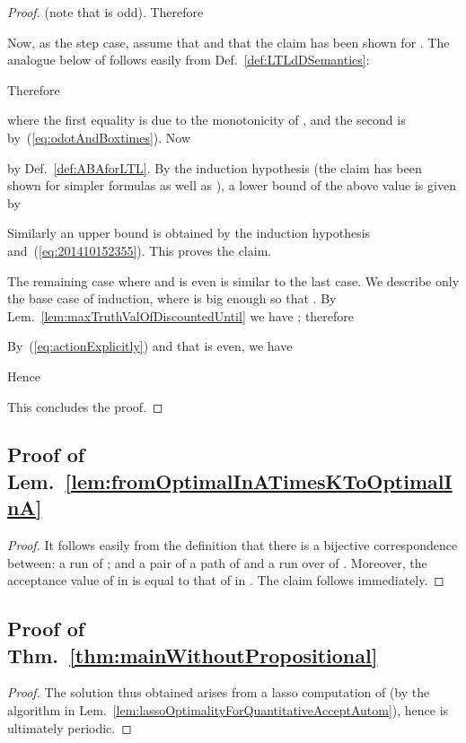 \documentclass[a4paper,USenglish,numberwithinsect]{lipics}
\theoremstyle{definition}
\theoremstyle{remark}
\theoremstyle{plain}
\begin{document}
\begin{proof}
(note that  is odd). Therefore



Now, as the step case, assume that   and that the claim has been shown for
 . The  analogue below of
  follows easily from Def.~\ref{def:LTLdDSemantics}:

Therefore

where the first equality is due to the monotonicity of
 , and the second is by~(\ref{eq:odotAndBoxtimes}).
Now

by Def.~\ref{def:ABAforLTL}. 
By the induction hypothesis (the claim has been shown for simpler
 formulas as well as ), a lower bound of the above value is given by

Similarly an upper bound  is obtained by the induction hypothesis
 and~(\ref{eq:201410152355}). This proves the claim.






The remaining case where 
  and 
   is even is similar to the last case. 
We describe only the base case of induction, where  is  big enough so that
 . By
 Lem.~\ref{lem:maxTruthValOfDiscountedUntil}
 we have ; therefore

By~(\ref{eq:actionExplicitly}) and that  is even, we have

Hence

This concludes the proof.
\end{proof}


\subsection{Proof of Lem.~\ref{lem:fromOptimalInATimesKToOptimalInA}}
\label{pf:lemfromOptimalInATimesKToOptimalInA}
\begin{proof}
 It follows easily from the definition that there is a bijective
 correspondence between: a run  of ; and a pair  of
 a path  of  and 
 a run  over  of . Moreover, 
 the acceptance value of  in  is equal to
 that of  in . The claim follows immediately.
\end{proof}


\subsection{Proof of Thm.~\ref{thm:mainWithoutPropositional}}
\label{pf:thmmain}
\begin{proof}
 
The solution   thus obtained arises from a lasso
 computation of  (by the algorithm
 in Lem.~\ref{lem:lassoOptimalityForQuantitativeAcceptAutom}), hence is
 ultimately periodic.
\end{proof}
\end{document}
